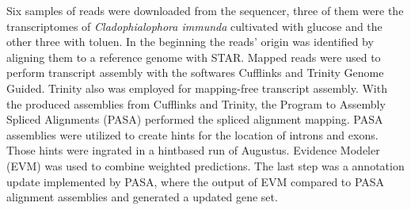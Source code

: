 \documentclass[11pt, a4paper]{report}
\begin{document}
Six samples of reads were downloaded from the sequencer, three of them were the transcriptomes of \textit{Cladophialophora immunda} cultivated with glucose and the other three with toluen.
In the beginning the reads' origin was identified by aligning them to a reference genome with STAR. Mapped reads were used to perform transcript assembly with the softwares Cufflinks and Trinity Genome Guided. Trinity also was employed for mapping-free transcript assembly. With the produced assemblies from Cufflinks and Trinity, the Program to Assembly Spliced Alignments (PASA) performed the spliced alignment mapping. PASA assemblies were utilized to create hints for the location of introns and exons. Those hints were ingrated in a hintbased run of Augustus. Evidence Modeler (EVM) was used to combine weighted predictions. The last step was a annotation update implemented by PASA, where the output of EVM compared to PASA alignment assemblies and generated a updated gene set. \cite{Haas2011} \cite{Steijger2013} \cite{Linde2015}
\end{document}
